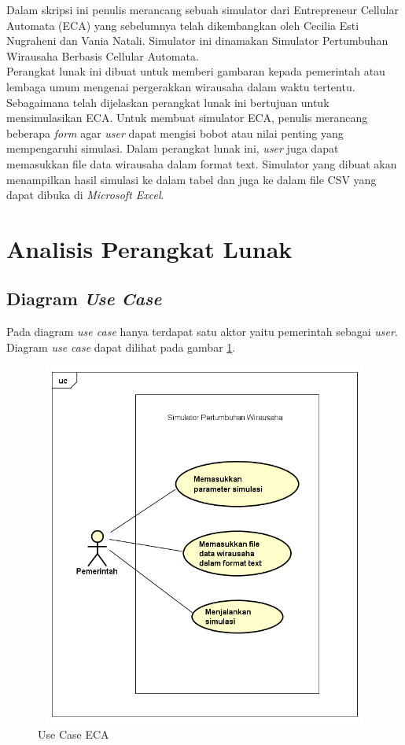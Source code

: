 Dalam skripsi ini penulis merancang sebuah simulator dari Entrepreneur Cellular Automata (ECA) yang sebelumnya telah dikembangkan oleh Cecilia Esti Nugraheni dan Vania Natali. Simulator ini dinamakan Simulator Pertumbuhan Wirausaha Berbasis Cellular Automata.\\
Perangkat lunak ini dibuat untuk memberi gambaran kepada pemerintah atau lembaga umum mengenai pergerakkan wirausaha dalam waktu tertentu. Sebagaimana telah dijelaskan perangkat lunak ini bertujuan untuk mensimulasikan ECA. Untuk membuat simulator ECA, penulis merancang beberapa \textit{form} agar \textit{user} dapat mengisi bobot atau nilai penting yang mempengaruhi simulasi. Dalam perangkat lunak ini, \textit{user} juga dapat memasukkan file data wirausaha dalam format text. Simulator yang dibuat akan menampilkan hasil simulasi ke dalam tabel dan juga ke dalam file CSV yang dapat dibuka di \textit{Microsoft Excel}.


\section{Analisis Perangkat Lunak}
\label{analisisPL}

\subsection{Diagram \textit{Use Case}}

Pada diagram \textit{use case} hanya terdapat satu aktor yaitu pemerintah sebagai \textit{user}. Diagram \textit{use case} dapat dilihat pada gambar \ref{fig:usecase}.

	\begin{figure} [H]
		\centering  
		\includegraphics[width=14cm, height=12cm]{UseCase2} 
		\caption[Use Case ECA]{Use Case ECA} 
		\label{fig:usecase} 
	\end{figure}
	
